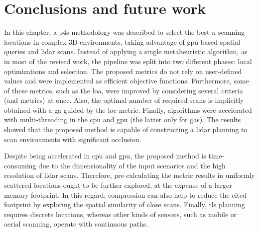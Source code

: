 \section{Conclusions and future work}

In this chapter, a \acrshort{p4s} methodology was described to select the best $n$ scanning locations in complex 3D environments, taking advantage of \acrshort{gpu}-based spatial queries and \acrshort{lidar} scans. Instead of applying a single metaheuristic algorithm, as in most of the revised work, the pipeline was split into two different phases: local optimizations and selection. The proposed metrics do not rely on user-defined values and were implemented as efficient objective functions. Furthermore, some of these metrics, such as the \acrshort{loa}, were improved by considering several criteria (and metrics) at once. Also, the optimal number of required scans is implicitly obtained with a \acrshort{ga} guided by the \acrshort{loc} metric. Finally, algorithms were accelerated with multi-threading in the \acrshort{cpu} and \acrshort{gpu} (the latter only for \acrshort{ga}s). The results showed that the proposed method is capable of constructing a \acrshort{lidar} planning to scan environments with significant occlusion.

Despite being accelerated in \acrshort{cpu} and \acrshort{gpu}, the proposed method is time-consuming due to the dimensionality of the input scenarios and the high resolution of \acrshort{lidar} scans. Therefore, pre-calculating the metric results in uniformly scattered locations ought to be further explored, at the expense of a larger memory footprint. In this regard, compression can also help to reduce the cited footprint by exploring the spatial similarity of close scans. Finally, \acrshort{tls} planning requires discrete locations, whereas other kinds of sensors, such as mobile or aerial scanning, operate with continuous paths.  
